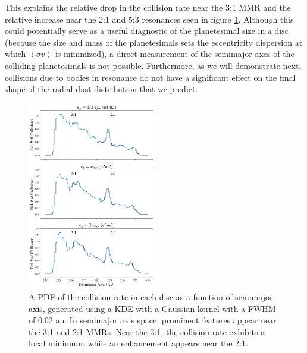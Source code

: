 This explains the relative drop in the collision rate near the 3:1 MMR and the relative increase near the 2:1 and 5:3 resonances 
seen in figure \ref{fig:coll_hist_a}. Although this could potentially serve as a useful diagnostic of the planetesimal size in a disc 
(because the size and mass of the planetesimals sets the eccentricity dispersion at which $\left< \sigma v \right>$ is minimized), 
a direct measurement of the semimajor axes of the colliding planetesimals is not possible. Furthermore, as we will demonstrate 
next, collisions due to bodies in resonance do not have a significant effect on the final shape of the radial dust distribution that 
we predict.

\begin{figure}
\begin{center}
    \includegraphics[width=0.5\textwidth]{figures/grind/coll_hist_a.png}
    \caption{A PDF of the collision rate in each disc as a function of semimajor axis, generated using a KDE with a Gaussian 
    kernel with a FWHM of 0.02 au. In semimajor axis space, prominent features appear near the 3:1 and 2:1 MMRs. Near the 
    3:1, the collision rate exhibits a local minimum, while an enhancement appears near the 2:1.\label{fig:coll_hist_a}}
\end{center}
\end{figure}

